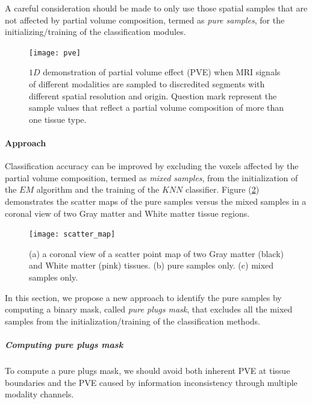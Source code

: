 A careful consideration should be made to only use those spatial samples that are not affected by partial volume composition, termed as \textit{pure samples}, for the initializing/training of the classification modules.

\begin{figure}
\centering
\texttt{[image: pve]}\
\centering
\caption{$1D$ demonstration of partial volume effect (PVE) when MRI signals of different modalities are sampled to discredited segments with different spatial resolution and origin. Question mark represent the sample values that reflect a partial volume composition of more than one tissue type.} 
\label{fig:pve}
\end{figure}

\paragraph{Approach} %

Classification accuracy can be improved by excluding the voxels affected by the partial volume composition, termed as \textit{mixed samples}, from the initialization of the $EM$ algorithm and the training of the $KNN$ classifier.
Figure (\ref{fig:scatter_map}) demonstrates the scatter maps of the pure samples versus the mixed samples in a coronal view of two Gray matter and White matter tissue regions.

\begin{figure}
\centering
\texttt{[image: scatter\_map]}\
\centering
\caption{(a) a coronal view of a scatter point map of two Gray matter (black) and White matter (pink) tissues. (b) pure samples only. (c) mixed samples only.} 
\label{fig:scatter_map}
\end{figure}

In this section, we propose a new approach to identify the pure samples by computing a binary mask, called \textit{pure plugs mask}, that excludes all the mixed samples from the initialization/training of the classification methods.

\subparagraph{Computing pure plugs mask}

To compute a pure plugs mask, we should avoid both inherent PVE at tissue boundaries and the PVE caused by information inconsistency through multiple modality channels.

